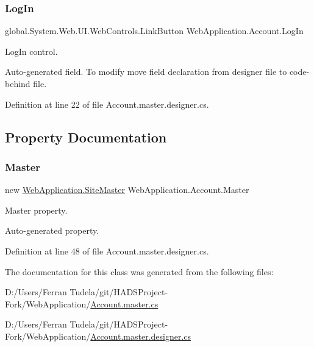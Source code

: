 \mbox{\label{classWebApplication_1_1Account_acf1883724583703dee1d49d5e7f8c9c8}} 
\subsubsection{\texorpdfstring{LogIn}{LogIn}}
{\footnotesize\ttfamily global.\+System.\+Web.\+U\+I.\+Web\+Controls.\+Link\+Button Web\+Application.\+Account.\+Log\+In\hspace{0.3cm}{\ttfamily [protected]}}



Log\+In control. 

Auto-\/generated field. To modify move field declaration from designer file to code-\/behind file. 

Definition at line 22 of file Account.\+master.\+designer.\+cs.



\subsection{Property Documentation}
\mbox{\label{classWebApplication_1_1Account_adc7988cc207da465340c81ceeda4c7cf}} 
\subsubsection{\texorpdfstring{Master}{Master}}
{\footnotesize\ttfamily new \mbox{\hyperlink{classWebApplication_1_1SiteMaster}{Web\+Application.\+Site\+Master}} Web\+Application.\+Account.\+Master\hspace{0.3cm}{\ttfamily [get]}}



Master property. 

Auto-\/generated property. 

Definition at line 48 of file Account.\+master.\+designer.\+cs.



The documentation for this class was generated from the following files\+:\begin{DoxyCompactItemize}
\item 
D\+:/\+Users/\+Ferran Tudela/git/\+H\+A\+D\+S\+Project-\/\+Fork/\+Web\+Application/\mbox{\hyperlink{Account_8master_8cs}{Account.\+master.\+cs}}\item 
D\+:/\+Users/\+Ferran Tudela/git/\+H\+A\+D\+S\+Project-\/\+Fork/\+Web\+Application/\mbox{\hyperlink{Account_8master_8designer_8cs}{Account.\+master.\+designer.\+cs}}\end{DoxyCompactItemize}
